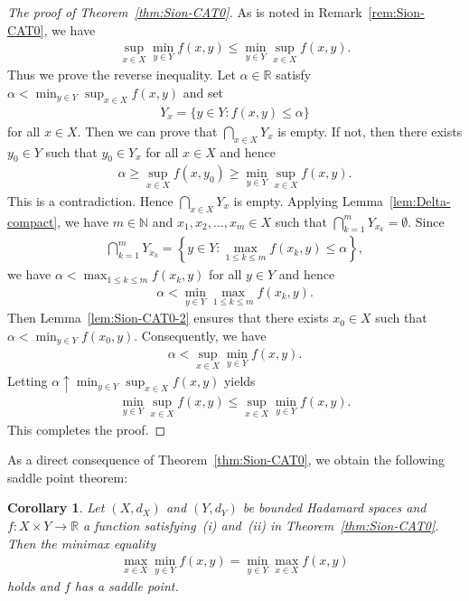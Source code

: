 \documentclass[draft]{amsart}
\numberwithin{equation}{section}
\def\N{\mathbb N}
\def\R{\mathbb R}
\theoremstyle{plain}
\newtheorem{corollary}[theorem]{Corollary}
\theoremstyle{definition}
\theoremstyle{remark}
\begin{document}
\begin{proof}[The proof of Theorem~\ref{thm:Sion-CAT0}]
 As is noted in Remark~\ref{rem:Sion-CAT0}, we have 
 \begin{align}
  \sup_{x\in X}\min_{y\in Y}f(x,y)\leq \min_{y\in Y}\sup_{x\in X}f(x,y). 
 \end{align}
 Thus we prove the reverse inequality. 
 Let $\alpha \in \R$ satisfy 
 $\alpha <\min_{y\in Y}\sup_{x\in X}f(x,y)$ 
 and set 
 \begin{align}
  Y_x=\bigl\{y\in Y: f(x,y)\leq \alpha\bigr\}
 \end{align}
 for all $x\in X$. Then we can prove that 
 $\bigcap _{x\in X}Y_x$ is empty. 
 If not, then there exists $y_0\in Y$ such that 
 $y_0\in Y_x$ for all $x\in X$ and hence 
 \begin{align}
  \alpha \geq \sup_{x\in X}f(x, y_0)
 \geq \min_{y\in Y}\sup_{x\in X}f(x,y). 
 \end{align}
 This is a contradiction. Hence $\bigcap _{x\in X}Y_x$ is empty. 
 Applying Lemma~\ref{lem:Delta-compact}, we have 
 $m\in \N$ and $x_1,x_2,\dots ,x_m\in X$ such that 
 $\bigcap_{k=1}^{m}Y_{x_k}=\emptyset$.  
 Since 
 \begin{align}
  \bigcap_{k=1}^{m}Y_{x_k} 
  = \left\{
 y\in Y: \max_{1\leq k\leq m}f(x_k,y)\leq \alpha
 \right\}, 
 \end{align}
 we have $\alpha < \max_{1\leq k\leq m}f(x_k,y)$ for all $y\in Y$ 
 and hence 
 \begin{align}
  \alpha < \min_{y\in Y}\max_{1\leq k\leq m}f(x_k,y). 
 \end{align}
 Then Lemma~\ref{lem:Sion-CAT0-2} ensures that 
 there exists $x_0\in X$ such that 
 $\alpha < \min_{y\in Y} f(x_0,y)$.  
 Consequently, we have 
 \begin{align}
  \alpha < \sup_{x\in X}\min_{y\in Y} f(x,y).  
 \end{align}
 Letting $\alpha \uparrow \min_{y\in Y}\sup_{x\in X}f(x,y)$ yields 
 \begin{align}
  \min_{y\in Y}\sup_{x\in X}f(x,y)
  \leq \sup_{x\in X}\min_{y\in Y} f(x,y). 
 \end{align} 
 This completes the proof.   
\end{proof}

As a direct consequence of Theorem~\ref{thm:Sion-CAT0}, 
we obtain the following saddle point theorem: 

\begin{corollary}\label{cor:Sion-CAT0}
 Let $(X,d_X)$ and $(Y,d_Y)$ be bounded Hadamard spaces and 
 $f\colon X\times Y\to \R$ a function 
 satisfying~(i) and~(ii) in 
 Theorem~\ref{thm:Sion-CAT0}. 
 Then the minimax equality 
 \begin{align}
  \max_{x\in X}\min_{y\in Y} f(x,y)=\min_{y\in Y} \max_{x\in X} f(x,y) 
 \end{align}
 holds and $f$ has a saddle point. 
\end{corollary}
\end{document}
